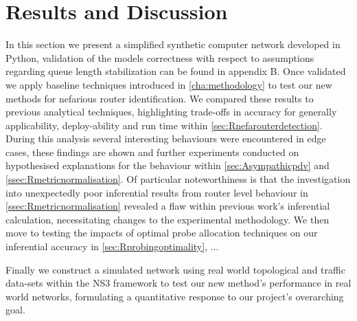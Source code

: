 \chapter{Results and Discussion}
\label{cha:result}
In this section we present a simplified synthetic computer network developed in Python, validation of the models correctness with respect to assumptions regarding queue length stabilization can be found in appendix B. Once validated we apply baseline techniques introduced in \cref{cha:methodology} to test our new methods for nefarious router identification. We compared these results to previous analytical techniques, highlighting trade-offs in accuracy for generally applicability, deploy-ability and run time within \cref{sec:Rnefarouterdetection}. During this analysis several interesting behaviours were encountered in edge cases, these findings are shown and further experiments conducted on hypothesised explanations for the behaviour within \cref{sec:Asympathicpdv} and \cref{ssec:Rmetricnormalisation}. Of particular noteworthiness is that the investigation into unexpectedly poor inferential results from router level \pdv  behaviour in \cref{ssec:Rmetricnormalisation} revealed a flaw within previous work's inferential calculation, necessitating changes to the experimental methodology. We then move to testing the impacts of optimal probe allocation techniques on our inferential accuracy in \cref{sec:Rprobingoptimality}, ...\par
{}
Finally we construct a simulated network using real world topological and traffic data-sets within the NS3 framework to test our new method's performance in real world networks, formulating a quantitative response to our project's overarching goal.

